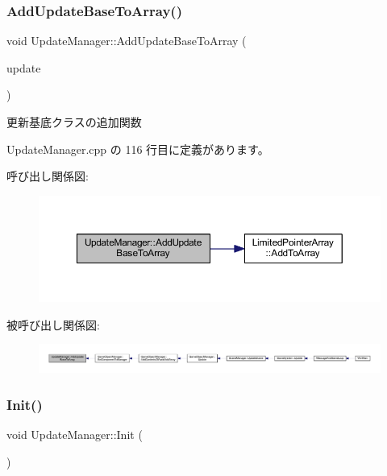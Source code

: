 \subsubsection{\texorpdfstring{Add\+Update\+Base\+To\+Array()}{AddUpdateBaseToArray()}}
{\footnotesize\ttfamily void Update\+Manager\+::\+Add\+Update\+Base\+To\+Array (\begin{DoxyParamCaption}\item[{\mbox{\hyperlink{class_update_base}{Update\+Base}} $\ast$}]{update }\end{DoxyParamCaption})}



更新基底クラスの追加関数 



 Update\+Manager.\+cpp の 116 行目に定義があります。

呼び出し関係図\+:\nopagebreak
\begin{figure}[H]
\begin{center}
\leavevmode
\includegraphics[width=350pt]{class_update_manager_afe4b39d94cde8294cc273cde32788eaa_cgraph}
\end{center}
\end{figure}
被呼び出し関係図\+:
\nopagebreak
\begin{figure}[H]
\begin{center}
\leavevmode
\includegraphics[width=350pt]{class_update_manager_afe4b39d94cde8294cc273cde32788eaa_icgraph}
\end{center}
\end{figure}
\mbox{\label{class_update_manager_a7b0a2a3bf51d4fcb83fd25fe642fc66b}} 
\subsubsection{\texorpdfstring{Init()}{Init()}}
{\footnotesize\ttfamily void Update\+Manager\+::\+Init (\begin{DoxyParamCaption}{ }\end{DoxyParamCaption})}



